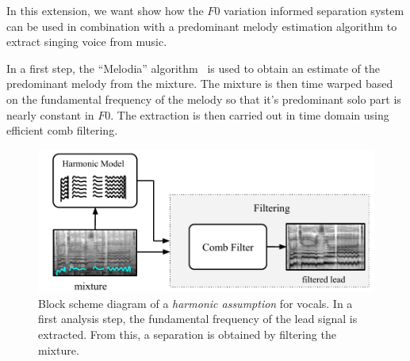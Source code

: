 
In this extension, we want show how the \(F0\) variation informed separation system can be used in combination with a predominant melody estimation algorithm to extract singing voice from music.

\par
In a first step, the ``Melodia'' algorithm~\cite{salamon12} is used to obtain an estimate of the predominant melody from the mixture.
The mixture is then time warped based on the fundamental frequency of the melody so that it’s predominant solo part is nearly constant in \(F0\). The extraction is then carried out in time domain using efficient comb filtering.

\begin{figure}[htbp]
	\centering
  \includegraphics[width=\columnwidth]{Chapters/05_Separation_Known/figures/comb_filter.pdf}
	\caption{Block scheme diagram of a \textit{harmonic assumption} for vocals. In a first analysis step, the fundamental frequency of the lead signal is extracted. From this, a separation is obtained by filtering the mixture.}
	\label{fig:methods_harmonicity}
\end{figure}

